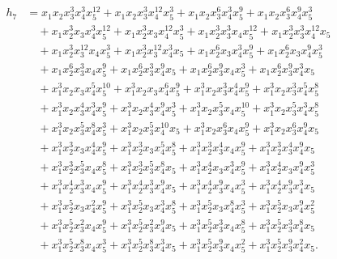 \documentclass[reqno]{amsart}
\theoremstyle{plain}
\theoremstyle{definition}
\theoremstyle{plain}
\theoremstyle{definition}
\numberwithin{equation}{section}
\begin{document}
\begin{align*}
h_7 &= x_1x_2x_3^{3}x_4^{3}x_5^{12} + x_1x_2x_3^{3}x_4^{12}x_5^{3} + x_1x_2x_3^{6}x_4^{3}x_5^{9} + x_1x_2x_3^{6}x_4^{9}x_5^{3}\\ &\quad + x_1x_2^{3}x_3x_4^{3}x_5^{12} + x_1x_2^{3}x_3x_4^{12}x_5^{3} + x_1x_2^{3}x_3^{3}x_4x_5^{12} + x_1x_2^{3}x_3^{3}x_4^{12}x_5\\ &\quad + x_1x_2^{3}x_3^{12}x_4x_5^{3} + x_1x_2^{3}x_3^{12}x_4^{3}x_5 + x_1x_2^{6}x_3x_4^{3}x_5^{9} + x_1x_2^{6}x_3x_4^{9}x_5^{3}\\ &\quad + x_1x_2^{6}x_3^{3}x_4x_5^{9} + x_1x_2^{6}x_3^{3}x_4^{9}x_5 + x_1x_2^{6}x_3^{9}x_4x_5^{3} + x_1x_2^{6}x_3^{9}x_4^{3}x_5\\ &\quad + x_1^{3}x_2x_3x_4^{5}x_5^{10} + x_1^{3}x_2x_3x_4^{6}x_5^{9} + x_1^{3}x_2x_3^{3}x_4^{4}x_5^{9} + x_1^{3}x_2x_3^{3}x_4^{5}x_5^{8}\\ &\quad + x_1^{3}x_2x_3^{4}x_4^{3}x_5^{9} + x_1^{3}x_2x_3^{4}x_4^{9}x_5^{3} + x_1^{3}x_2x_3^{5}x_4x_5^{10} + x_1^{3}x_2x_3^{5}x_4^{3}x_5^{8}\\ &\quad + x_1^{3}x_2x_3^{5}x_4^{8}x_5^{3} + x_1^{3}x_2x_3^{5}x_4^{10}x_5 + x_1^{3}x_2x_3^{6}x_4x_5^{9} + x_1^{3}x_2x_3^{6}x_4^{9}x_5\\ &\quad + x_1^{3}x_2^{3}x_3x_4^{4}x_5^{9} + x_1^{3}x_2^{3}x_3x_4^{5}x_5^{8} + x_1^{3}x_2^{3}x_3^{4}x_4x_5^{9} + x_1^{3}x_2^{3}x_3^{4}x_4^{9}x_5\\ &\quad + x_1^{3}x_2^{3}x_3^{5}x_4x_5^{8} + x_1^{3}x_2^{3}x_3^{5}x_4^{8}x_5 + x_1^{3}x_2^{4}x_3x_4^{3}x_5^{9} + x_1^{3}x_2^{4}x_3x_4^{9}x_5^{3}\\ &\quad + x_1^{3}x_2^{4}x_3^{3}x_4x_5^{9} + x_1^{3}x_2^{4}x_3^{3}x_4^{9}x_5 + x_1^{3}x_2^{4}x_3^{9}x_4x_5^{3} + x_1^{3}x_2^{4}x_3^{9}x_4^{3}x_5\\ &\quad + x_1^{3}x_2^{5}x_3x_4^{2}x_5^{9} + x_1^{3}x_2^{5}x_3x_4^{3}x_5^{8} + x_1^{3}x_2^{5}x_3x_4^{8}x_5^{3} + x_1^{3}x_2^{5}x_3x_4^{9}x_5^{2}\\ &\quad + x_1^{3}x_2^{5}x_3^{2}x_4x_5^{9} + x_1^{3}x_2^{5}x_3^{2}x_4^{9}x_5 + x_1^{3}x_2^{5}x_3^{3}x_4x_5^{8} + x_1^{3}x_2^{5}x_3^{3}x_4^{8}x_5\\ &\quad + x_1^{3}x_2^{5}x_3^{8}x_4x_5^{3} + x_1^{3}x_2^{5}x_3^{8}x_4^{3}x_5 + x_1^{3}x_2^{5}x_3^{9}x_4x_5^{2} + x_1^{3}x_2^{5}x_3^{9}x_4^{2}x_5.
\end{align*}
\end{document}
